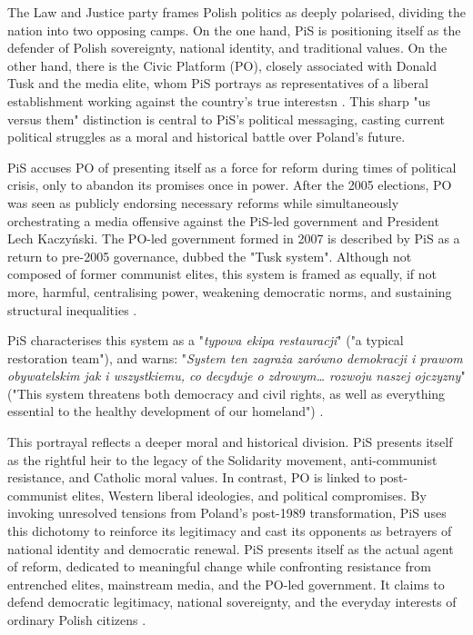 The Law and Justice party frames Polish politics as deeply polarised, dividing the nation into two opposing camps. On the one hand, PiS is positioning itself as the defender of Polish sovereignty, national identity, and traditional values. On the other hand, there is the Civic Platform (PO), closely associated with Donald Tusk and the media elite, whom PiS portrays as representatives of a liberal establishment working against the country's true interestsn \citep{pis_program_2014}. This sharp "us versus them" distinction is central to PiS's political messaging, casting current political struggles as a moral and historical battle over Poland's future.

PiS accuses PO of presenting itself as a force for reform during times of political crisis, only to abandon its promises once in power. After the 2005 elections, PO was seen as publicly endorsing necessary reforms while simultaneously orchestrating a media offensive against the PiS-led government and President Lech Kaczyński. The PO-led government formed in 2007 is described by PiS as a return to pre-2005 governance, dubbed the "Tusk system". Although not composed of former communist elites, this system is framed as equally, if not more, harmful, centralising power, weakening democratic norms, and sustaining structural inequalities \citep{pis_program_2014}.

PiS characterises this system as a "\textit{typowa ekipa restauracji}" ("a typical restoration team"), and warns: "\textit{System ten zagraża zarówno demokracji i prawom obywatelskim jak i wszystkiemu, co decyduje o zdrowym… rozwoju naszej ojczyzny}" ("This system threatens both democracy and civil rights, as well as everything essential to the healthy development of our homeland") \citep{pis_program_2014}.

This portrayal reflects a deeper moral and historical division. PiS presents itself as the rightful heir to the legacy of the Solidarity movement, anti-communist resistance, and Catholic moral values. In contrast, PO is linked to post-communist elites, Western liberal ideologies, and political compromises. By invoking unresolved tensions from Poland's post-1989 transformation, PiS uses this dichotomy to reinforce its legitimacy and cast its opponents as betrayers of national identity and democratic renewal. PiS presents itself as the actual agent of reform, dedicated to meaningful change while confronting resistance from entrenched elites, mainstream media, and the PO-led government. It claims to defend democratic legitimacy, national sovereignty, and the everyday interests of ordinary Polish citizens \citep{pis_program_2014}.

